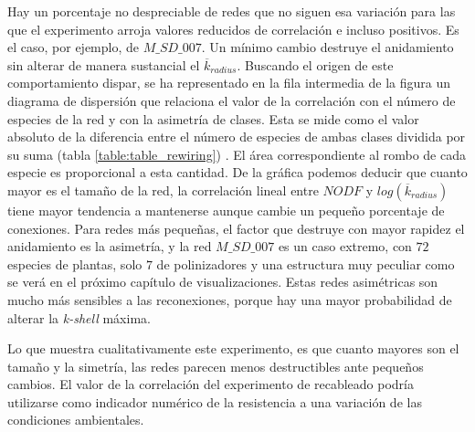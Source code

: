 Hay un porcentaje no despreciable de redes que no siguen esa variación para las que el experimento arroja valores reducidos de correlación e incluso positivos. Es el caso, por ejemplo, de $M\_SD\_007$. Un mínimo cambio destruye el anidamiento sin alterar de manera sustancial el $\overline {k}_{radius}$. Buscando el origen de este comportamiento dispar, se ha representado en la fila intermedia de la figura un diagrama de dispersión que relaciona el valor de la correlación con el número de especies de la red y con la asimetría de clases. Esta se mide como el valor absoluto de la diferencia entre el número de especies de ambas clases dividida por su suma (tabla \ref{table:table_rewiring}) . El área correspondiente al rombo de cada especie es proporcional a esta cantidad. De la gráfica podemos deducir que cuanto mayor es el tamaño de la red, la correlación lineal entre $NODF$ y $log(\overline {k}_{radius})$ tiene mayor tendencia a mantenerse aunque cambie un pequeño porcentaje de conexiones. Para redes más pequeñas, el factor que destruye con mayor rapidez el anidamiento es la asimetría, y la red $M\_SD\_007$ es un caso extremo, con $72$ especies de plantas, solo $7$ de polinizadores y una estructura muy peculiar como se verá en el próximo capítulo de visualizaciones. Estas redes asimétricas son mucho más sensibles a las reconexiones, porque hay una mayor probabilidad de alterar la \textit{k-shell} máxima.

Lo que muestra cualitativamente este experimento, es que cuanto  mayores son el tamaño y la simetría, las redes parecen menos destructibles ante pequeños cambios. El valor de la correlación del experimento de recableado podría utilizarse como indicador numérico de la resistencia a una variación de las condiciones ambientales.

